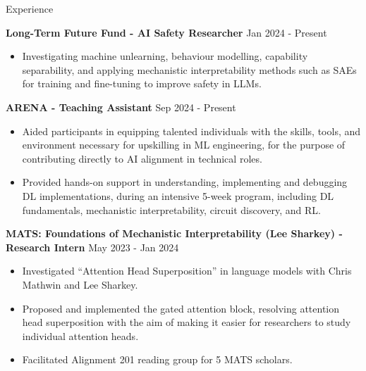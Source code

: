 \documentclass[hidelinks]{resume} %
\begin{document}
\begin{rSection}{Experience}
    
\textbf{Long-Term Future Fund - AI Safety Researcher}
\hfill {Jan 2024 - Present}
\begin{itemize}
    \item Investigating machine unlearning, behaviour modelling, capability separability, and applying mechanistic interpretability methods such as SAEs for training and fine-tuning to improve safety in LLMs.
\end{itemize}

\textbf{ARENA - Teaching Assistant}
\hfill{Sep 2024 - Present}
\begin{itemize}
    \item Aided participants in equipping talented individuals with the skills, tools, and environment necessary for upskilling in ML engineering, for the purpose of contributing directly to AI alignment in technical roles.
    \item Provided hands-on support in understanding, implementing and debugging DL implementations, during an intensive 5-week program, including DL fundamentals, mechanistic interpretability, circuit discovery, and RL.
\end{itemize}

\textbf{MATS: Foundations of Mechanistic Interpretability (Lee Sharkey) - Research Intern}
\hfill {May 2023 - Jan 2024}
\begin{itemize}
    \item Investigated ``Attention Head Superposition'' in language models with Chris Mathwin and Lee Sharkey.
    \item Proposed and implemented the gated attention block, resolving attention head superposition with the aim of making it easier for researchers to study individual attention heads.
    \item Facilitated Alignment 201 reading group for 5 MATS scholars.
\end{itemize}


\end{rSection}
\end{document}
